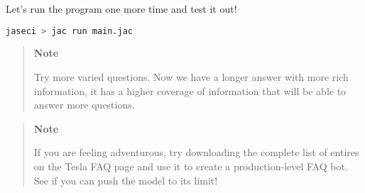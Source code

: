 Let's run the program one more time and test it out!

\begin{lstlisting}[language=bash]
jaseci > jac run main.jac
\end{lstlisting}

\begin{quote}
\textbf{Note}

Try more varied questions. Now we have a longer answer with more rich
information, it has a higher coverage of information that will be able
to answer more questions.
\end{quote}

\begin{quote}
\textbf{Note}

If you are feeling adventurous, try downloading the complete list of
entires on the Tesla FAQ page and use it to create a production-level
FAQ bot. See if you can push the model to its limit!
\end{quote}
